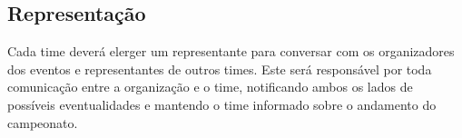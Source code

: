 \subsection{Representação}

Cada time deverá elerger um representante para conversar com os organizadores dos eventos e representantes de outros times. Este será responsável por toda comunicação entre a organização e o time, notificando ambos os lados de possíveis eventualidades e mantendo o time informado sobre o andamento do campeonato.